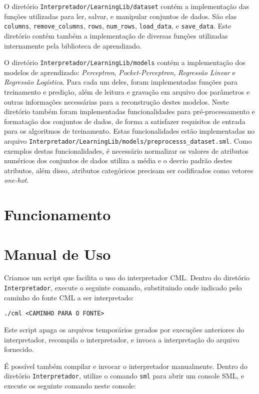 \documentclass[12pt]{article}
\begin{document}
O diretório \texttt{Interpretador/LearningLib/dataset} contém a implementação das funções utilizadas para ler, salvar, e manipular conjuntos de dados. São elas \texttt{columns}, \texttt{remove\_columns}, \texttt{rows}, \texttt{num\_rows}, \texttt{load\_data}, e \texttt{save\_data}. Este diretório contém também a implementação de diversas funções utilizadas internamente pela biblioteca de aprendizado.

O diretório \texttt{Interpretador/LearningLib/models} contém a implementação dos modelos de aprendizado: \textit{Perceptron}, \textit{Pocket-Perceptron}, \textit{Regressão Linear} e \textit{Regressão Logística}. Para cada um deles, foram implementadas funções para treinamento e predição, além de leitura e gravação em arquivo dos parâmetros e outras informações necessárias para a reconstrução destes modelos. Neste diretório também foram implementadas funcionalidades para pré-processamento e formatação dos conjuntos de dados, de forma a satisfazer requisitos de entrada para os algoritmos de treinamento. Estas funcionalidades estão implementadas no arquivo \texttt{Interpretador/LearningLib/models/preprocesss\_dataset.sml}. Como exemplos destas funcionalidades, é necessário normalizar os valores de atributos numéricos dos conjuntos de dados utiliza a média e o desvio padrão destes atributos, além disso, atributos categóricos precisam ser codificados como vetores \textit{one-hot}.


\section{Funcionamento}

\section{Manual de Uso}\label{Man}

Criamos um script que facilita o uso do interpretador CML. Dentro do diretório \texttt{Interpretador}, execute o seguinte comando, substituindo onde indicado pelo caminho do fonte CML a ser interpretado:

\begin{verbatim}
./cml <CAMINHO PARA O FONTE>
\end{verbatim}

Este script apaga os arquivos temporários gerados por execuções anteriores do interpretador, recompila o interpretador, e invoca a interpretação do arquivo fornecido.

É possível também compilar e invocar o interpretador manualmente. Dentro do diretório \texttt{Interpretador}, utilize o comando \texttt{sml} para abrir um console SML, e execute os seguinte comando neste console:
\end{document}
